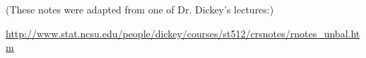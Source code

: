 \vspace{1in}

\noindent
(These notes were adapted from one of Dr. Dickey's lectures:) \\
\begin{large}
\href{http://www.stat.ncsu.edu/people/dickey/courses/st512/crsnotes/rnotes_unbal.htm}
{http://www.stat.ncsu.edu/people/dickey/courses/st512/crsnotes/rnotes\_unbal.htm}
\end{large}



\newpage
























